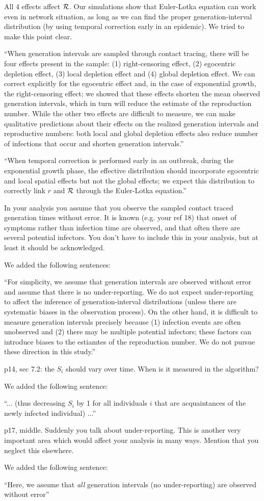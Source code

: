 \documentclass[12pt]{article}
\newcommand{\RR}{\ensuremath{{\cal R}}}
\newcommand{\revtext}{\textsf}
\begin{document}
All 4 effects affect $\RR$. Our simulations show that Euler-Lotka equation can work even in network situation, as long as we can find the proper generation-interval distribution (by using temporal correction early in an epidemic). We tried to make this point clear.

``When generation intervals are sampled through contact tracing, there will be four effects present in the sample: (1) right-censoring effect, (2) egocentric depletion effect, (3) local depletion effect and (4) global depletion effect.
We can correct explicitly for the egocentric effect and, in the case of exponential growth, the right-censoring effect;
we showed that these effects shorten the mean observed generation intervals, which in turn will reduce the estimate of the reproduction number.
While the other two effects are difficult to measure, we can make qualitative predictions about their effects on the realized generation intervals and reproductive numbers: 
both local and global depletion effects also reduce number of infections that occur and shorten generation intervals.''

``When temporal correction is performed early in an outbreak, during the exponential growth phase, the effective distribution should incorporate egocentric and local spatial effects but not the global effects; we expect this distribution to correctly link $r$ and $\RR$ through the Euler-Lotka equation.''

\revtext{In your analysis you assume that you observe the sampled contact traced generation times without error. It is known (e.g. your ref 18) that onset of symptoms rather than infection time are observed, and that often there are several potential infectors. You don't have to include this in your analysis, but at least it should be acknowledged.}

We added the following sentences:

``For simplicity, we assume that generation intervals are observed without error and assume that there is no under-reporting. 
We do not expect under-reporting to affect the inference of generation-interval distributions (unless there are systematic biases in the observation process).
On the other hand, it is difficult to measure generation intervals precisely because (1) infection events are often unobserved and (2) there may be multiple potential infectors; these factors can introduce biases to the estiamtes of the reproduction number.
We do not pursue these direction in this study.''

\revtext{p14, sec 7.2: the $S_i$ should vary over time. When is it measured in the algorithm?}

We added the following sentence:

``... (thus decreasing $S_i$ by 1 for all individuals $i$ that are acquaintances of the newly infected individual) ...''

\revtext{p17, middle. Suddenly you talk about under-reporting. This is another very important area which would affect your analysis in many ways. Mention that you neglect this elsewhere.
}

We added the following sentence:

``Here, we assume that \emph{all} generation intervals (no under-reporting) are observed without error''
\end{document}
